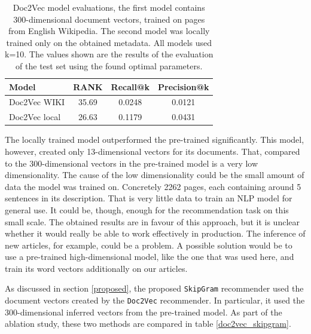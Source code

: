 \begin{table}[H]
    \centering
    \begin{tabular}{| l | c | c | c |}
        \hline
        Model & \textbf{RANK} & \textbf{Recall@k} & \textbf{Precision@k} \\ \hline
        Doc2Vec WIKI    &   35.69   &   0.0248  &   0.0121    \\ \hline
        Doc2Vec local   &   26.63   &   0.1179  &   0.0431    \\ \hline
    \end{tabular}
    \caption{Doc2Vec model evaluations, the first model contains 300-dimensional document vectors, trained on pages from English Wikipedia. The second model was locally trained only on the obtained metadata. All models used k=10. The values shown are the results of the evaluation of the test set using the found optimal parameters. \cite{WikiDoc2Vec}}
    \label{tab:doc2vec_comparison}
\end{table}
The locally trained model outperformed the pre-trained significantly. This model, however, created only 13-dimensional vectors for its documents. That, compared to the 300-dimensional vectors in the pre-trained model is a very low dimensionality. The cause of the low dimensionality could be the small amount of data the model was trained on. Concretely 2262 pages, each containing around 5 sentences in its description. That is very little data to train an NLP model for general use. It could be, though, enough for the recommendation task on this small scale. The obtained results are in favour of this approach, but it is unclear whether it would really be able to work effectively in production. The inference of new articles, for example, could be a problem. A possible solution would be to use a pre-trained high-dimensional model, like the one that was used here, and train its word vectors additionally on our articles.

As discussed in section \ref{proposed}, the proposed \texttt{SkipGram} recommender used the document vectors created by the \texttt{Doc2Vec} recommender. In particular, it used the 300-dimensional inferred vectors from the pre-trained model. As part of the ablation study, these two methods are compared in table \ref{doc2vec_skipgram}.

